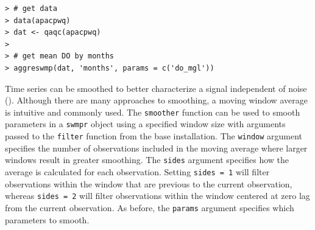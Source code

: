 \documentclass[10pt,letterpaper]{article}\usepackage[]{graphicx}\usepackage[]{color}
\makeatletter
\newenvironment{kframe}{%
 \def\at@end@of@kframe{}%
 \ifinner\ifhmode%
  \def\at@end@of@kframe{\end{minipage}}%
  \begin{minipage}{\columnwidth}%
 \fi\fi%
 \def\FrameCommand##1{\hskip\@totalleftmargin \hskip-\fboxsep
 \colorbox{shadecolor}{##1}\hskip-\fboxsep
     \hskip-\linewidth \hskip-\@totalleftmargin \hskip\columnwidth}%
 \MakeFramed {\advance\hsize-\width
   \@totalleftmargin\z@ \linewidth\hsize
   \@setminipage}}%
 {\par\unskip\endMakeFramed%
 \at@end@of@kframe}
\newenvironment{knitrout}{}{} %
\makeatother
\begin{document}
\begin{knitrout}\small
{}\color{fgcolor}\begin{kframe}
\begin{verbatim}
> # get data
> data(apacpwq)
> dat <- qaqc(apacpwq)
> 
> # get mean DO by months
> aggreswmp(dat, 'months', params = c('do_mgl'))
\end{verbatim}
\end{kframe}
\end{knitrout}

Time series can be smoothed to better characterize a signal independent of noise ().  Although there are many approaches to smoothing, a moving window average is intuitive and commonly used.  The \texttt{smoother} function can be used to smooth parameters in a \texttt{swmpr} object using a specified window size with arguments passed to the \texttt{filter} function from the base installation.  The \texttt{window} argument specifies the number of observations included in the moving average where larger windows result in greater smoothing.  The \texttt{sides} argument specifies how the average is calculated for each observation.  Setting \texttt{sides = 1} will filter observations within the window that are previous to the current observation, whereas \texttt{sides = 2} will filter observations within the window centered at zero lag from the current observation. As before, the \texttt{params} argument specifies which parameters to smooth.
\end{document}
